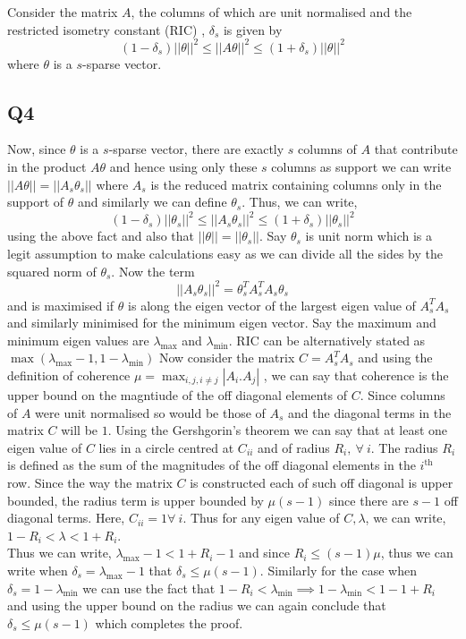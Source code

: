 \documentclass{article}
\begin{document}
Consider the matrix $A$, the columns of which are unit normalised and the restricted isometry constant (RIC) , $\delta_s$ is given by
$$ (1- \delta_s)||\theta||^2 \leq ||A\theta||^2 \leq (1+\delta_s)||\theta||^2 $$ where $\theta$ is a $s$-sparse vector. 

\subsection*{Q4}

Now, since $\theta$ is a $s$-sparse vector, there are exactly $s$ columns of $A$ that contribute in the product $A\theta$ and hence using only these $s$ columns as support we can write $||A\theta|| = ||A_s \theta_s||$ where $A_s$ is the reduced matrix containing columns only in the support of $\theta$ and similarly we can define $\theta_s$. Thus, we can write, $$ (1- \delta_s)||\theta_s||^2 \leq ||A_s\theta_s||^2 \leq (1+\delta_s)||\theta_s||^2 $$ using the above fact and also that $||\theta|| = ||\theta_s||$. Say $\theta_s$ is unit norm which is a legit assumption to make calculations easy as we can divide all the sides by the squared norm of $\theta_s$. Now the term $$ || A_s \theta_s ||^2 = \theta_s^T A_s^T A_s \theta_s $$ and is maximised if $\theta$ is along the eigen vector of the largest eigen value of $A_s^T A_s$ and similarly minimised for the minimum eigen vector. Say the maximum and minimum eigen values are $\lambda_{\text{max}}$ and $\lambda_{\text{min}}$.  RIC can be alternatively stated as $\max(\lambda_{\text{max}} -1, 1 - \lambda_{\text{min}}) $ Now consider the matrix $C = A_s^T A_s$ and using the definition of coherence $\mu = \operatorname*{\max}_{i,j, i\neq j} |A_i . A_j| $ , we can say that coherence is the upper bound on the magntiude of the off diagonal elements of $C$. Since columns of $A$ were unit normalised so would be those of $A_s$ and the diagonal terms in the matrix $C$ will be $1$. Using the Gershgorin's theorem we can say that at least one eigen value of $C$ lies in a circle centred at $C_{ii}$ and of radius $R_i, \ \forall \ i$. The radius $R_i$ is defined as the sum of the magnitudes of the off diagonal elements in the $i^{\text{th}}$ row. Since the way the matrix $C$ is constructed each of such off diagonal is upper bounded, the radius term is upper bounded by $\mu (s-1)$ since there are $s-1$ off diagonal terms. Here, $C_{ii} = 1 \forall \ i $. Thus for any eigen value of $C, \lambda$, we can write, $ 1-R_i < \lambda < 1 + R_i $. \\ 

Thus we can write, $ \lambda_{\text{max}} - 1 < 1 + R_i -1$ and since $R_i \leq (s-1)\mu$, thus we can write when $\delta_s = \lambda_{\text{max}} -1 $ that $\delta_s \leq \mu (s-1)$.  Similarly for the case when $\delta_s = 1 - \lambda_{\text{min}}$ we can use the fact that $1-R_i < \lambda_{\text{min}} \implies 1 - \lambda_{\text{min}} < 1-1 + R_i$ and using the upper bound on the radius we can again conclude that $\delta_s \leq \mu (s-1)$ which completes the proof.

 
\end{document}
